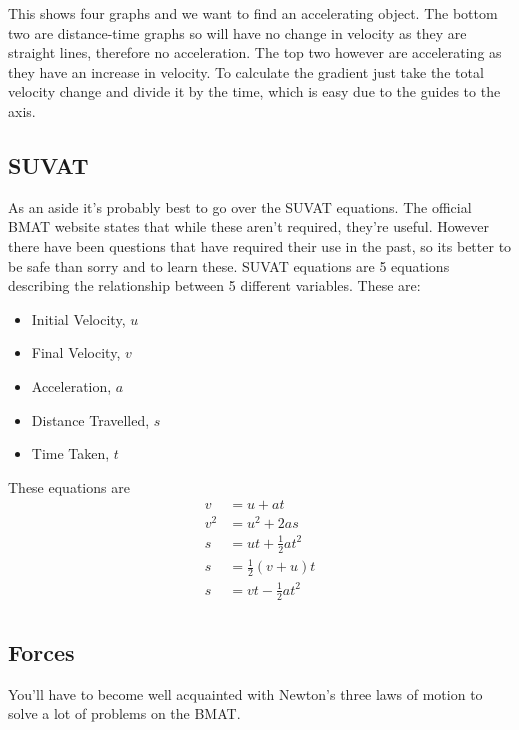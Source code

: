 \documentclass[11pt, titlepage]{article}
\begin{document}
This shows four graphs and we want to find an accelerating object.  The bottom two are distance-time graphs so will have no change in velocity as they are straight lines, therefore no acceleration.  The top two however are accelerating as they have an increase in velocity.  To calculate the gradient just take the total velocity change and divide it by the time, which is easy due to the guides to the axis.

\subsection{SUVAT}
As an aside it's probably best to go over the SUVAT equations.  The official BMAT website states that while these aren't required, they're useful.  However there have been questions that have required their use in the past, so its better to be safe than sorry and to learn these.  SUVAT equations are 5 equations describing the relationship between 5 different variables.  These are:
\begin{itemize}
\item Initial Velocity, $u$
\item Final Velocity, $v$
\item Acceleration, $a$
\item Distance Travelled, $s$
\item Time Taken, $t$
\end{itemize}

These equations are
\begin{equation*}
\begin{aligned}
v&=u+at\\
v^2&=u^2+2as\\
s&=ut+\frac{1}{2}at^2\\
s&= \frac{1}{2} (v+u)t\\
s&= vt - \frac{1}{2}at^2\\
\end{aligned}
\end{equation*}






\subsection{Forces}
You'll have to become well acquainted with Newton's three laws of motion to solve a lot of problems on the BMAT. 
\end{document}
